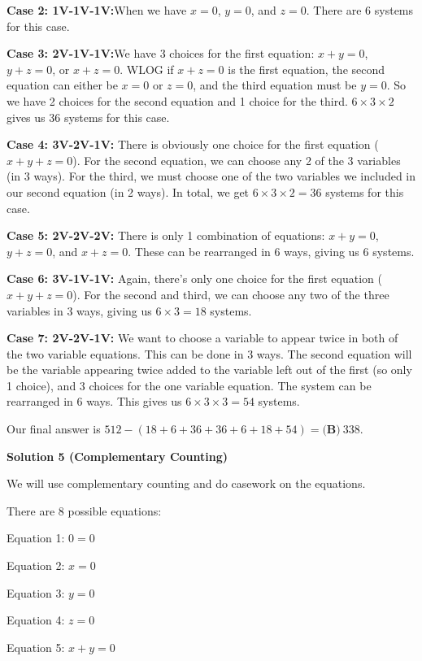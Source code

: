 \begin{enumerate}
 \textbf{Case 2: 1V-1V-1V:}When we have $x = 0$, $y = 0$, and $z = 0$. There are 6 systems for this case.

 \textbf{Case 3: 2V-1V-1V:}We have 3 choices for the first equation: $x + y = 0$, $y + z = 0$, or $x + z = 0$. WLOG if $x + z = 0$ is the first equation, the second equation can either be $x = 0$ or $z = 0$, and the third equation must be $y = 0$. So we have 2 choices for the second equation and 1 choice for the third. $6 \times 3 \times 2$ gives us 36 systems for this case.

 \textbf{Case 4: 3V-2V-1V:} There is obviously one choice for the first equation ($x + y + z = 0$). For the second equation, we can choose any 2 of the 3 variables (in 3 ways). For the third, we must choose one of the two variables we included in our second equation (in 2 ways). In total, we get $6 \times 3 \times 2 = 36$ systems for this case.

 \textbf{Case 5: 2V-2V-2V:} There is only 1 combination of equations: $x + y = 0$, $y + z = 0$, and $x + z = 0$. These can be rearranged in 6 ways, giving us 6 systems.

 \textbf{Case 6: 3V-1V-1V:} Again, there's only one choice for the first equation ($x + y + z = 0$). For the second and third, we can choose any two of the three variables in 3 ways, giving us $6 \times 3 = 18$ systems.

 \textbf{Case 7: 2V-2V-1V:} We want to choose a variable to appear twice in both of the two variable equations. This can be done in 3 ways. The second equation will be the variable appearing twice added to the variable left out of the first (so only 1 choice), and 3 choices for the one variable equation. The system can be rearranged in 6 ways. This gives us $6 \times 3 \times 3 = 54$ systems.

 Our final answer is $512 - (18 + 6 + 36 + 36 + 6 + 18 + 54)  = \boxed{\textbf{(B)}\ 338}.$




\textbf{Solution 5 (Complementary Counting)}

We will use complementary counting and do casework on the equations.

 There are $8$ possible equations:

 Equation 1: $0 = 0$

 Equation 2: $x = 0$

 Equation 3: $y = 0$

 Equation 4: $z = 0$

 Equation 5: $x + y = 0$


\end{enumerate}
